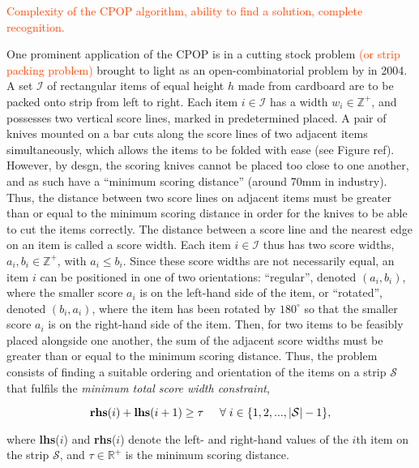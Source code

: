 \documentclass[oribibl]{llncs}
\begin{document}
\textcolor{OrangeRed}{Complexity of the CPOP algorithm, ability to find a solution, complete recognition.}

One prominent application of the CPOP is in a cutting stock problem \textcolor{OrangeRed}{(or strip packing problem)} brought to light as an open-combinatorial problem by \cite{goulimis2004} in 2004. A set $\mathcal{I}$ of rectangular items of equal height $h$ made from cardboard are to be packed onto  strip from left to right. Each item $i \in \mathcal{I}$ has a width $w_i \in \mathbb{Z}^{+}$, and possesses two vertical score lines, marked in predetermined placed. A pair of knives mounted on a bar cuts along the score lines of two adjacent items simultaneously, which allows the items to be folded with ease (see Figure ref{}). However, by desgn, the scoring knives cannot be placed too close to one another, and as such have a ``minimum scoring distance'' (around 70mm in industry). Thus, the distance between two score lines on adjacent items must be greater than or equal to the minimum scoring distance in order for the knives to be able to cut the items correctly. The distance between a score line and the nearest edge on an item is called a score width. Each item $i \in \mathcal{I}$ thus has two score widths, $a_i, b_i \in \mathbb{Z}^{+}$, with $a_i \leq b_i$. Since these score widths are not necessarily equal, an item $i$ can be positioned in one of two orientations: ``regular'', denoted $(a_i, b_i)$, where the smaller score $a_i$ is on the left-hand side of the item, or ``rotated'', denoted $(b_i, a_i)$, where the item has been rotated by $180^{\circ}$ so that the smaller score $a_i$ is on the right-hand side of the item. Then, for two items to be feasibly placed alongside one another, the sum of the adjacent score widths must be greater than or equal to the minimum scoring distance. Thus, the problem consists of finding a suitable ordering and orientation of the items on a strip $\mathcal{S}$ that fulfils the \textit{minimum total score width constraint},

\begin{equation}
\label{eqn:mtswc}
\textup{\textbf{rhs}}(i) + \textup{\textbf{lhs}}(i+1) \geq \tau \hspace{5mm} \forall \hspace{1mm} i \in \{1,2,..., |\mathcal{S}|-1\},
\end{equation}

where \textup{\textbf{lhs}($i$)} and \textup{\textbf{rhs}($i$)} denote the left- and right-hand values of the $i$th item on the strip $\mathcal{S}$, and $\tau \in \mathbb{R}^{+}$ is the minimum scoring distance.
\end{document}
